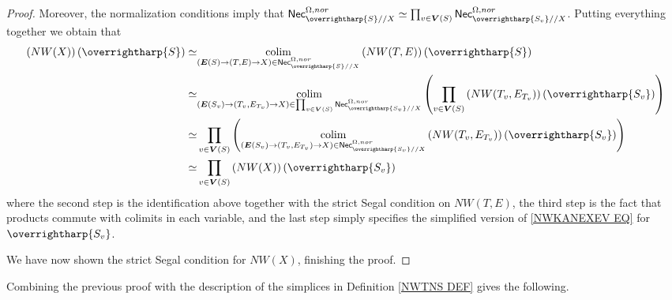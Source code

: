 \documentclass[a4paper,10pt
,draft
]{article}%
\numberwithin{equation}{section}
\numberwithin{figure}{section}
\theoremstyle{definition} %
\newcommand{\vect}[1]{\text{\overrightharp{\ensuremath{#1}}}}
\DeclareMathOperator{\colim}{colim}%
\newcommand{\1}{\ensuremath{\mathbbm 1}}%
\begin{document}
\begin{proof}
	Moreover, the normalization conditions imply that
	$\mathsf{Nec}_{\vect{S}//X}^{\Omega,nor} 
	\simeq
	\prod_{v \in \boldsymbol{V}(S)}
	\mathsf{Nec}_{\vect{S_v}//X}^{\Omega,nor}$.
	Putting everything together we obtain that
	\begin{equation}
	\begin{aligned}
	\left(NW(X)\right)(\vect{S}) 
	\simeq &
	\underset{(\boldsymbol{E}(S) \to (T,E) \to X)
		\in \mathsf{Nec}^{\Omega,nor}_{\vect{S}//X}}{\colim}
	\left(NW(T,E)\right)(\vect{S})
	\\
	\simeq &
	\underset{(\boldsymbol{E}(S_v) \to (T_v,E_{T_v}) \to X)
		\in 
		\prod_{v \in \boldsymbol{V}(S)} \mathsf{Nec}^{\Omega,nor}_{\vect{S_v}//X}}{\colim}
	\left(\prod_{v \in \boldsymbol{V}(S)}
	\left(NW(T_v,E_{T_v})\right)(\vect{S_v})\right)
	\\
	\simeq &
	\prod_{v \in \boldsymbol{V}(S)}
	\left(
	\underset{(\boldsymbol{E}(S_v) \to (T_v,E_{T_v}) \to X)
		\in \mathsf{Nec}^{\Omega,nor}_{\vect{S_v}//X}}{\colim}
	\left(NW(T_v,E_{T_v})\right)(\vect{S_v})
	\right)
	\\
	\simeq &
	\prod_{v \in \boldsymbol{V}(S)} 
	\left(NW(X)\right)(\vect{S_v}) 
	\end{aligned}
	\end{equation}
	where the second step is the identification above together with 
	the strict Segal condition on 
	$NW(T,E)$,
	the third step is the fact that products commute with colimits in each variable, and the last step simply specifies
	the simplified version of \eqref{NWKANEXEV EQ}
	for $\vect{S_v}$.
	
	We have now shown the 
	strict Segal condition for $NW(X)$, 
	finishing the proof.
\end{proof}


Combining the previous proof with the description of the simplices 
in Definition \ref{NWTNS DEF} gives the following.
\end{document}
